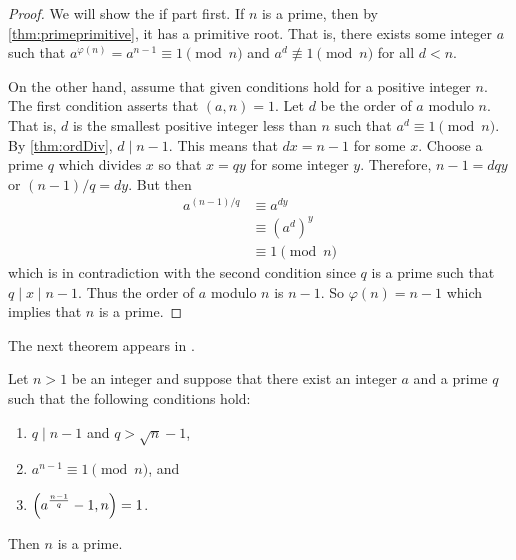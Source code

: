 \documentclass{subfiles}
\begin{document}
		\begin{proof}
			We will show the if part first. If $n$ is a prime, then by \autoref{thm:primeprimitive}, it has a primitive root. That is, there exists some integer $a$ such that $a^{\varphi(n)} = a^{n-1} \equiv 1 \pmod n$ and $a^d \not \equiv 1 \pmod n$ for all $d<n$.

			On the other hand, assume that given conditions hold for a positive integer $n$. The first condition asserts that $(a,n)=1$. Let $d$ be the order of $a$ modulo $n$. That is, $d$ is the smallest positive integer less than $n$ such that $a^d \equiv 1 \pmod n$. By \autoref{thm:ordDiv}, $d\mid n-1$. This means that $dx = n-1$ for some $x$. Choose a prime $q$ which divides $x$ so that $x=qy$ for some integer $y$. Therefore, $n-1=dqy$ or $(n-1)/q=dy$. But then
				\begin{align*}
					a^{(n-1)/q}
						& \equiv a^{dy}\\
						& \equiv \left(a^d\right)^y\\
						& \equiv 1 \pmod n
				\end{align*}
			which is in contradiction with the second condition since $q$ is a prime such that $q\mid x\mid n-1$. Thus the order of $a$ modulo $n$ is $n-1$. So $\varphi(n)=n-1$ which implies that $n$ is a prime.
		\end{proof}
	The next theorem appears in \textcite[Chapter $\S$VI, section $6.3$, proposition $6.3.1$, Page $187$]{koblitz_2012}.
		\begin{theorem}
			Let $n>1$ be an integer and suppose that there exist an integer $a$ and a prime $q$ such that the following conditions hold:
				\begin{enumerate}
					\item $q\mid n-1$ and $q > \sqrt n -1$,
					\item $a^{n-1} \equiv1\pmod n$, and
					\item $\func{}{a^{\frac{n-1}{q}}-1,n} = 1$.
				\end{enumerate}
			Then $n$ is a prime.
		\end{theorem}
\end{document}
